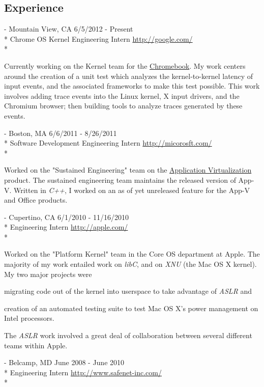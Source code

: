 \documentclass[a4paper,margin,line]{resume}
\newcommand{\rurl}[1]{\hfill {\footnotesize \url{#1}}}
\newcommand{\rdate}[1]{\hfill {\small #1}}
\renewcommand{\employer}[5]{\item[#1] - #2 \rdate{#3} \\* #4 \rurl{#5} \\*}
\begin{document}
\begin{resume}
\section{\mysidestyle Experience}
	\begin{asparadesc}
		\employer{Google}{Mountain View, CA}{6/5/2012 - Present}{Chrome OS Kernel Engineering Intern}{http://google.com/}

		\small
		Currently working on the Kernel team for the \href{http://www.google.com/intl/en/chrome/devices/}{Chromebook}. My work centers around the creation of a unit test which analyzes the kernel-to-kernel latency of input events, and the associated frameworks to make this test possible. This work involves adding trace events into the Linux kernel, X input drivers, and the Chromium browser; then building tools to analyze traces generated by these events.
		\normalsize
		\\
		\employer{Microsoft}{Boston, MA}{6/6/2011 - 8/26/2011}{Software Development Engineering Intern}{http://micorosft.com/}

		\small
		Worked on the "Sustained Engineering" team on the \href{http://www.microsoft.com/windows/enterprise/solutions/virtualization/products/app-v.aspx}{Application Virtualization} product. The sustained engineering team maintains the released version of App-V. Written in \emph{C++}, I worked on an as of yet unreleased feature for the App-V and Office products.
		\normalsize
		\\
		\employer{Apple Inc}{Cupertino, CA}{6/1/2010 - 11/16/2010}{Engineering Intern}{http://apple.com/}

		\small
		Worked on the "Platform Kernel" team in the Core OS department at Apple. The majority of my work entailed work on \emph{libC}, and on \emph{XNU} (the Mac OS X kernel). My two major projects were \begin{inparaenum} \item migrating code out of the kernel into userspace to take advantage of \emph{ASLR} and \item creation of an automated testing suite to test Mac OS X's power management on Intel processors. \end{inparaenum} The \emph{ASLR} work involved a great deal of collaboration between several different teams within Apple.
		\normalsize
		\\
%
		\employer{SafeNet Inc}{Belcamp, MD}{June 2008 - June 2010}{Engineering Intern}{http://www.safenet-inc.com/}


\end{asparadesc}
\end{resume}
\end{document}
